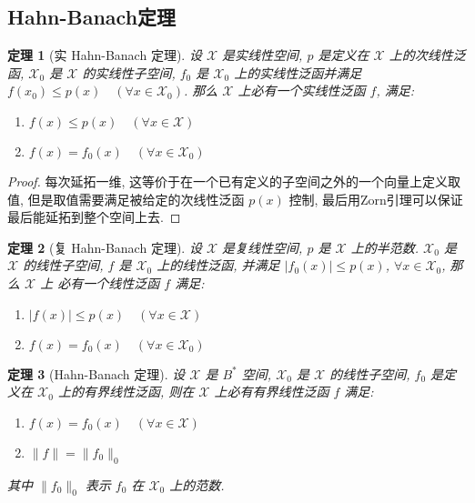 \documentclass[12pt,a4paper]{article}
\newtheorem{thm}{定理}[subsection]  %
\begin{document}
\subsection{Hahn-Banach定理}
\begin{thm}[实 Hahn-Banach 定理]
    设 $\mathscr{X}$ 是实线性空间, $p$ 是定义在 $\mathscr{X}$ 上的次线性泛函, $\mathscr{X}_0$ 是 $\mathscr{X}$ 的实线性子空间, 
    $f_0$ 是 $\mathscr{X}_0$ 上的实线性泛函并满足 $f(x_0) \leq p(x) \quad (\forall x \in \mathscr{X}_0)$. 
    那么 $\mathscr{X}$ 上必有一个实线性泛函 $f$, 满足:
    \begin{enumerate}[label=(\roman*),font=\upshape]
        \item $f(x) \leq p(x) \quad (\forall x \in \mathscr{X})$
        \item $f(x) = f_0(x) \quad (\forall x \in \mathscr{X}_0)$
    \end{enumerate}
\end{thm}
\begin{proof}
    每次延拓一维, 这等价于在一个已有定义的子空间之外的一个向量上定义取值, 但是取值需要满足被给定的次线性泛函 $p(x)$ 控制, 
    最后用Zorn引理可以保证最后能延拓到整个空间上去. 
\end{proof}
\begin{thm}[复 Hahn-Banach 定理]
    设 $\mathscr{X}$ 是复线性空间, $p$ 是 $\mathscr{X}$ 上的半范数. $\mathscr{X}_0$ 是 $\mathscr{X}$ 的线性子空间, 
    $f$ 是 $\mathscr{X}_0$ 上的线性泛函, 并满足 $|f_0(x)| \leq p(x)$, $\forall x \in \mathscr{X}_0$, 那么 $\mathscr{X}$ 上
    必有一个线性泛函 $f$ 满足:
    \begin{enumerate}[label=(\roman*),font=\upshape]
        \item $|f(x)| \leq p(x) \quad (\forall x \in \mathscr{X})$
        \item $f(x) = f_0(x) \quad (\forall x \in \mathscr{X}_0)$
    \end{enumerate}
\end{thm}
\begin{thm}[Hahn-Banach 定理]
    设 $\mathscr{X}$ 是 $B^*$ 空间, $\mathscr{X}_0$ 是 $\mathscr{X}$ 的线性子空间, 
    $f_0$ 是定义在 $\mathscr{X}_0$ 上的有界线性泛函, 则在 $\mathscr{X}$ 上必有有界线性泛函 $f$ 满足:
    \begin{enumerate}[label=(\roman*),font=\upshape]
        \item $f(x) = f_0(x) \quad (\forall x \in \mathscr{X})$
        \item $\|f\| = \|f_0\|_0$
    \end{enumerate}
    其中 $\|f_0\|_0$ 表示 $f_0$ 在 $\mathscr{X}_0$ 上的范数.
\end{thm}
\end{document}
